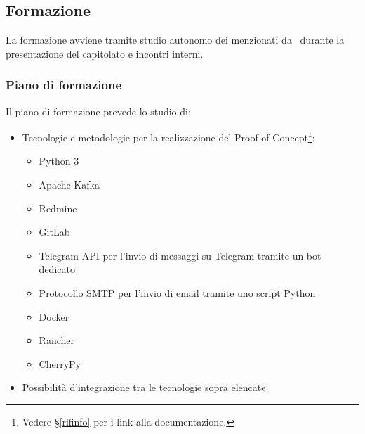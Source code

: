 	\subsection{Formazione}\label{Formazione}

		La formazione avviene tramite studio autonomo dei  menzionati da \II\ durante la presentazione del capitolato e incontri interni.

		\subsubsection{Piano di formazione}
		Il piano di formazione prevede lo studio di:
		\begin{itemize}
			\item Tecnologie e metodologie per la realizzazione del Proof of Concept\footnote{Vedere \S\ref{rifinfo} per i link alla documentazione.}:
			\begin{itemize}
				\item Python 3
				\item Apache Kafka
				\item Redmine
				\item GitLab
				\item Telegram API per l'invio di messaggi su Telegram tramite un bot dedicato
				\item Protocollo SMTP per l'invio di email tramite uno script Python
				\item Docker
				\item Rancher
				\item CherryPy
			\end{itemize}
			\item Possibilità d'integrazione tra le tecnologie sopra elencate
		\end{itemize}
